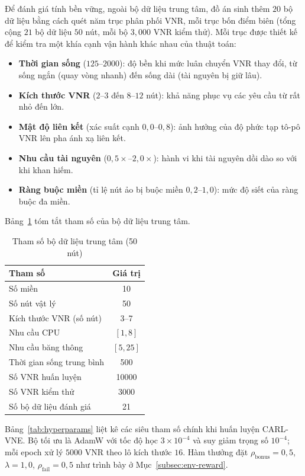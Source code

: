 \documentclass[../DoAn.tex]{subfiles}
\begin{document}
Để đánh giá tính bền vững, ngoài bộ dữ liệu trung tâm, đồ án sinh thêm $20$ bộ dữ liệu bằng cách quét năm trục phân phối VNR, mỗi trục bốn điểm biên (tổng cộng $21$ bộ dữ liệu $50$ nút, mỗi bộ $3{,}000$ VNR kiểm thử). Mỗi trục được thiết kế để kiểm tra một khía cạnh vận hành khác nhau của thuật toán:
\begin{itemize}
\item \textbf{Thời gian sống} ($125$–$2000$): độ bền khi mức luân chuyển VNR thay đổi, từ sống ngắn (quay vòng nhanh) đến sống dài (tài nguyên bị giữ lâu).
\item \textbf{Kích thước VNR} ($2$–$3$ đến $8$–$12$ nút): khả năng phục vụ các yêu cầu từ rất nhỏ đến lớn.
\item \textbf{Mật độ liên kết} (xác suất cạnh $0{,}0$–$0{,}8$): ảnh hưởng của độ phức tạp tô-pô VNR lên pha ánh xạ liên kết.
\item \textbf{Nhu cầu tài nguyên} ($0{,}5\times$–$2{,}0\times$): hành vi khi tài nguyên dồi dào so với khi khan hiếm.
\item \textbf{Ràng buộc miền} (tỉ lệ nút ảo bị buộc miền $0{,}2$–$1{,}0$): mức độ siết của ràng buộc đa miền.
\end{itemize}
Bảng~\ref{tab:datasets} tóm tắt tham số của bộ dữ liệu trung tâm.

\begin{table}[H]
\centering
\caption{Tham số bộ dữ liệu trung tâm (50 nút)}
\label{tab:datasets}
\begin{tabular}{lc}
\toprule
\textbf{Tham số} & \textbf{Giá trị} \\
\midrule
Số miền & 10 \\
Số nút vật lý & 50 \\
Kích thước VNR (số nút) & 3--7 \\
Nhu cầu CPU & $[1, 8]$ \\
Nhu cầu băng thông & $[5, 25]$ \\
Thời gian sống trung bình & 500 \\
Số VNR huấn luyện & 10000 \\
Số VNR kiểm thử & 3000 \\
Số bộ dữ liệu đánh giá & 21 \\
\bottomrule
\end{tabular}
\end{table}

Bảng~\ref{tab:hyperparams} liệt kê các siêu tham số chính khi huấn luyện CARL-VNE. Bộ tối ưu là AdamW với tốc độ học $3\times10^{-4}$ và suy giảm trọng số $10^{-4}$; mỗi epoch xử lý $5000$ VNR theo lô kích thước $16$. Hàm thưởng đặt $\rho_{\text{bonus}}=0{,}5$, $\lambda=1{,}0$, $\rho_{\text{fail}}=0{,}5$ như trình bày ở Mục~\ref{subsec:env-reward}.
\end{document}
